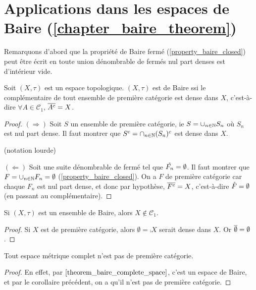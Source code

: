 \section{Applications dans les espaces de Baire (\ref{chapter_baire_theorem})}

Remarquons d'abord que la propriété de Baire fermé
(\ref{property_baire_closed}) peut être écrit en toute union dénombrable
de fermés nul part denses est d'intérieur vide.

\begin{proposition}
	\label{proposition_first_set_category_equiv_baire}
	Soit $(X, \tau)$ est un espace topologique.
	$(X, \tau)$ est de Baire ssi le complémentaire de tout ensemble de première
	catégorie est dense dans $X$, c'est-à-dire $\forall A \in \mathcal{C}_{1}$,
	$\overline{A^{c}} = X$.
\end{proposition}

\begin{proof}
	$(\Rightarrow)$
	Soit $S$ un ensemble de première catégorie, ie $S = \cup_{n \in \mathbb{N}}
	S_{n}$ où $S_{n}$ est nul part dense. Il faut montrer que $S^{c} =
	\cap_{n \in \mathbb{N}} (S_{n})^{c}$ est dense dans $X$.

	(notation lourde)

	$(\Leftarrow)$
	Soit  une suite dénombrable de fermé tel que
	$\mathring{F_{n}} = \emptyset$.
	Il faut montrer que $F = \cup_{n \in \mathbb{N}} F_{n} = \emptyset$
	(\ref{property_baire_closed}).
	On a $F$ de première catégorie car chaque $F_{n}$ est nul part dense, et
	donc par hypothèse, $\overline{F^{c}} = X$, c'est-à-dire $\mathring{F} =
	\emptyset$ (en passant au complémentaire).
\end{proof}

\begin{corollary}
	Si $(X, \tau)$ est un ensemble de Baire, alors $X \notin \mathcal{C}_{1}$.
\end{corollary}

\begin{proof}
	Si $X$ est de première catégorie, alors $\emptyset = \comp{X}$ serait dense
	dans $X$. Or $\overline{\emptyset} = \emptyset$.
\end{proof}

\begin{corollary}
	Tout espace métrique complet n'est pas de première catégorie.
\end{corollary}

\begin{proof}
	En effet, par $\ref{theorem_baire_complete_space}$, c'est un espace de
	Baire, et par le corollaire précédent, on a qu'il n'est pas de première catégorie.
\end{proof}

